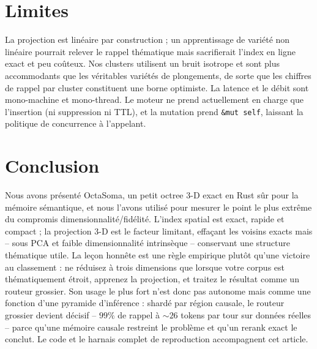 \documentclass[11pt]{article}
\begin{document}
\section{Limites}
La projection est linéaire par construction ; un apprentissage de variété non linéaire
pourrait relever le rappel thématique mais sacrifierait l'index en ligne exact et peu
coûteux. Nos clusters utilisent un bruit isotrope et sont plus accommodants que les
véritables variétés de plongements, de sorte que les chiffres de rappel par cluster
constituent une borne optimiste. La latence et le débit sont mono-machine et
mono-thread. Le moteur ne prend actuellement en charge que l'insertion (ni
suppression ni TTL), et la mutation prend \texttt{\&mut self}, laissant la politique
de concurrence à l'appelant.

\section{Conclusion}
Nous avons présenté OctaSoma, un petit octree 3-D exact en Rust sûr pour la mémoire
sémantique, et nous l'avons utilisé pour mesurer le point le plus extrême du compromis
dimensionnalité/fidélité. L'index spatial est exact, rapide et compact ; la projection
3-D est le facteur limitant, effaçant les voisins exacts mais -- sous PCA et faible
dimensionnalité intrinsèque -- conservant une structure thématique utile. La leçon
honnête est une règle empirique plutôt qu'une victoire au classement : ne réduisez à
trois dimensions que lorsque votre corpus est thématiquement étroit, apprenez la
projection, et traitez le résultat comme un routeur grossier. Son usage le plus fort
n'est donc pas autonome mais comme une fonction d'une pyramide d'inférence : shardé
par région causale, le routeur grossier devient décisif -- $99\%$ de rappel à
${\sim}26$ tokens par tour sur données réelles -- parce qu'une mémoire causale
restreint le problème et qu'un rerank exact le conclut. Le code et le harnais complet
de reproduction accompagnent cet article.
\end{document}
